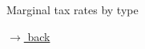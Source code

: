 \documentclass[11pt,aspectratio=169]{beamer}
\begin{document}
\begin{frame}{Marginal tax rates by type}
\begin{figure}[h!!]
	\end{figure}
	
	\vspace{-4mm}
	\hfill
	\hyperlink{backOPT}{\tiny{$\rightarrow$ back}}
	
\end{frame}

\end{document}
